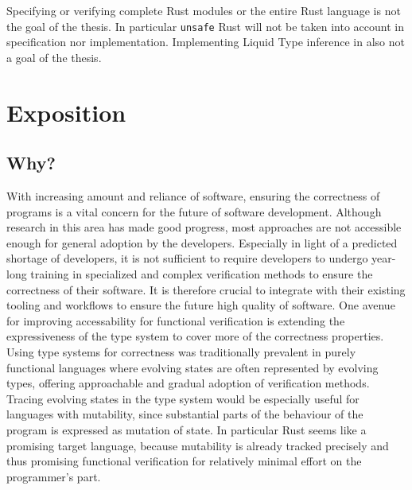 \documentclass[11pt]{article}
\newcommand{\code}[1]{\texttt{#1}}
\begin{document}
Specifying or verifying complete Rust modules or the entire Rust language is not the goal of the thesis. In particular \code{unsafe} Rust will not be taken into account in specification nor implementation. Implementing Liquid Type inference in also not a goal of the thesis.


\section{Exposition}

\subsection{Why?}

With increasing amount and reliance of software, ensuring the correctness of programs is a vital concern for the future of software development.
Although research in this area has made good progress, most approaches are not accessible enough for general adoption by the developers. Especially in light of a predicted shortage of developers\cite{breaux_2021_2021-1}, it is not sufficient to require developers to undergo year-long training in specialized and complex verification methods to ensure the correctness of their software. It is therefore crucial to integrate with their existing tooling and workflows to ensure the future high quality of software.
One avenue for improving accessability for functional verification is extending the expressiveness of the type system to cover more of the correctness properties.
Using type systems for correctness was traditionally prevalent in purely functional languages where evolving states are often represented by evolving types, offering approachable and gradual adoption of verification methods. Tracing evolving states in the type system would be especially useful for languages with mutability, since substantial parts of the behaviour of the program is expressed as mutation of state. In particular Rust seems like a promising target language, because mutability is already tracked precisely and thus promising functional verification for relatively minimal effort on the programmer's part.

\end{document}
